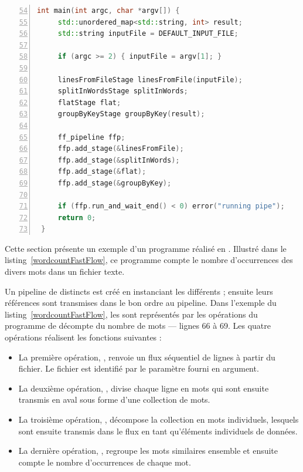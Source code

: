 \begin{lstlisting}[language=c++, frame=single, float, numbers=left,firstnumber=54]
 int main(int argc, char *argv[]) {
     std::unordered_map<std::string, int> result;
     std::string inputFile = DEFAULT_INPUT_FILE;

     if (argc >= 2) { inputFile = argv[1]; } 

     linesFromFileStage linesFromFile(inputFile);
     splitInWordsStage splitInWords;
     flatStage flat;
     groupByKeyStage groupByKey(result);

     ff_pipeline ffp;
     ffp.add_stage(&linesFromFile);
     ffp.add_stage(&splitInWords);
     ffp.add_stage(&flat);
     ffp.add_stage(&groupByKey);

     if (ffp.run_and_wait_end() < 0) error("running pipe");
     return 0;
 }
\end{lstlisting}

Cette section pr\'esente un exemple d'un programme r\'ealis\'e en . Illustr\'e dans le listing~\ref{wordcountFastFlow}, ce programme compte le nombre d'occurrences des divers mots dans un fichier texte. 

Un {pipeline} de   distincts est cr\'e\'e en instanciant les  diff\'erents ; ensuite leurs r\'ef\'erences sont transmises dans le bon ordre au {pipeline}. Dans l'exemple du listing~\ref{wordcountFastFlow}, les  sont repr\'esent\'es par les op\'erations du programme de d\'ecompte du nombre de mots --- lignes 66 \`a 69.  Les quatre op\'erations r\'ealisent les fonctions suivantes :

\begin{itemize}
    \item La premi\`ere op\'eration, , renvoie un flux s\'equentiel de lignes \`a partir du fichier. Le fichier est identifi\'e par le param\`etre  fourni en argument.

    \item La deuxi\`eme op\'eration, , divise chaque ligne en mots qui sont ensuite transmis en aval sous forme d'une collection de mots.
    
    \item La troisi\`eme op\'eration, , décompose la collection en mots individuels, lesquels sont ensuite transmis dans le flux en tant qu'éléments individuels de données.
    
    \item La derni\`ere op\'eration, , regroupe les mots similaires ensemble et ensuite compte le nombre d'occurrences de chaque mot.
    
\end{itemize}
